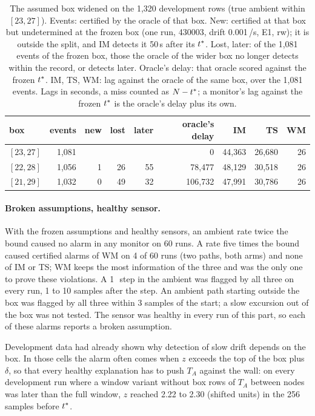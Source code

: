 \begin{table}[t]
\centering\small
\caption{The assumed box widened on the 1,320 development rows (true ambient within $[23, 27]$). Events: certified by
the oracle of that box. New: certified at that box but undetermined at the frozen box (one run, 430003, drift
0.001\,\degC/s, E1, rw); it is outside the split, and IM detects it 50\,s after its $t^{\ast}$. Lost, later: of the 1,081
events of the frozen box, those the oracle of the wider box no longer detects within the record, or detects later. Oracle's delay: that oracle scored against the frozen $t^{\ast}$. IM, TS,
WM: lag against the oracle of the same box, over the 1,081 events. Lags in seconds, a miss counted as $N-t^{\ast}$; a
monitor's lag against the frozen $t^{\ast}$ is the oracle's delay plus its own.}
\label{tab:widebox}
\begin{tabular}{lrrrrrrrr}
\toprule
box & events & new & lost & later & oracle's delay & IM & TS & WM\\
\midrule
$[23, 27]$ & 1,081 & & & & 0 & 44,363 & 26,680 & 26\\
$[22, 28]$ & 1,056 & 1 & 26 & 55 & 78,477 & 48,129 & 30,518 & 26\\
$[21, 29]$ & 1,032 & 0 & 49 & 32 & 106,732 & 47,991 & 30,786 & 26\\
\bottomrule
\end{tabular}
\end{table}

\paragraph{Broken assumptions, healthy sensor.} With the frozen assumptions and healthy sensors, an ambient rate twice
the bound caused no alarm in any monitor on 60 runs. A rate five times the bound caused certified alarms of WM on 4 of
60 runs (two paths, both arms) and none of IM or TS; WM keeps the most information of the three and was the only one to
prove these violations. A 1\,\degC\ step in the ambient was flagged by all three on every run, 1 to 10 samples after the
step. An ambient path starting outside the box was flagged by all three within 3 samples of the start; a slow excursion
out of the box was not tested. The sensor was healthy in every run of this part, so each of these alarms reports a
broken assumption.

Development data had already shown why detection of slow drift depends on the box. In those cells the alarm often
comes when $z$ exceeds the top of the box plus $\delta$, so that every healthy explanation has to push $T_A$ against
the wall: on every development run where a window variant without box rows of $T_A$ between nodes was later than the
full window, $z$ reached 2.22 to 2.30 (shifted units) in the 256 samples before $t^{\ast}$.

